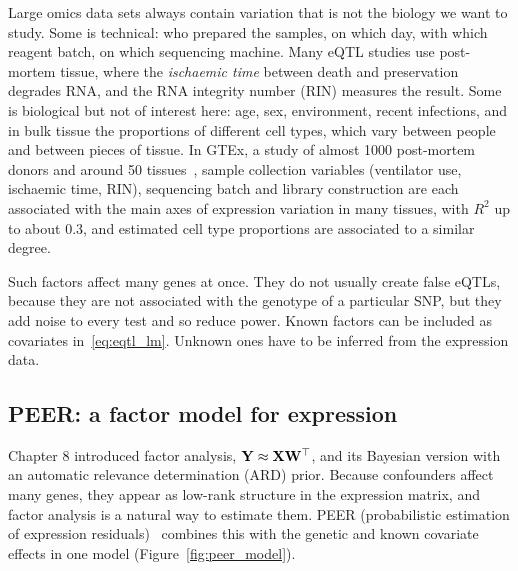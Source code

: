 Large omics data sets always contain variation that is not the biology we want to study. Some is technical: who prepared the samples, on which day, with which reagent batch, on which sequencing machine. Many eQTL studies use post-mortem tissue, where the \emph{ischaemic time} between death and preservation degrades RNA, and the RNA integrity number (RIN) measures the result. Some is biological but not of interest here: age, sex, environment, recent infections, and in bulk tissue the proportions of different cell types, which vary between people and between pieces of tissue. In GTEx, a study of almost 1000 post-mortem donors and around 50 tissues~\citep{gtex2020}, sample collection variables (ventilator use, ischaemic time, RIN), sequencing batch and library construction are each associated with the main axes of expression variation in many tissues, with $R^2$ up to about 0.3, and estimated cell type proportions are associated to a similar degree.

Such factors affect many genes at once. They do not usually create false eQTLs, because they are not associated with the genotype of a particular SNP, but they add noise to every test and so reduce power. Known factors can be included as covariates in~\eqref{eq:eqtl_lm}. Unknown ones have to be inferred from the expression data.

\subsection{PEER: a factor model for expression}

Chapter 8 introduced factor analysis, $\mathbf{Y}\approx\mathbf{X}\mathbf{W}^\top$, and its Bayesian version with an automatic relevance determination (ARD) prior. Because confounders affect many genes, they appear as low-rank structure in the expression matrix, and factor analysis is a natural way to estimate them. PEER (probabilistic estimation of expression residuals)~\citep{stegle2010,stegle2012} combines this with the genetic and known covariate effects in one model (Figure~\ref{fig:peer_model}).

